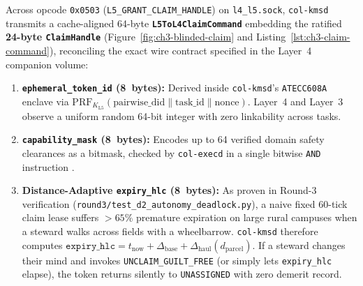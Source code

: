 Across opcode \texttt{0x0503} (\texttt{L5\_GRANT\_CLAIM\_HANDLE}) on \texttt{l4\_l5.sock},
\texttt{col-kmsd} transmits a cache-aligned 64-byte \textbf{\texttt{L5ToL4ClaimCommand}}
embedding the ratified \textbf{24-byte \texttt{ClaimHandle}} (Figure~\ref{fig:ch3-blinded-claim} and
Listing~\ref{lst:ch3-claim-command}), reconciling the exact wire contract specified in the
Layer~4 companion volume:
\begin{enumerate}
\item \textbf{\texttt{ephemeral\_token\_id} (8~bytes):} Derived inside \texttt{col-kmsd}'s
        \texttt{ATECC608A} enclave via
        $\mathrm{PRF}_{K_{\mathrm{L5}}}(\mathrm{pairwise\_did} \parallel \mathrm{task\_id} \parallel \mathrm{nonce})$.
        Layer~4 and Layer~3 observe a uniform random 64-bit integer with zero linkability across
        tasks.
\item \textbf{\texttt{capability\_mask} (8~bytes):} Encodes up to 64 verified domain safety
        clearances as a bitmask, checked by \texttt{col-execd} in a single bitwise \texttt{AND}
        instruction \parencite{miller2006robust,iec61508}.
\item \textbf{Distance-Adaptive \texttt{expiry\_hlc} (8~bytes):} As proven in Round-3 verification
        (\texttt{round3/test\_d2\_autonomy\_deadlock.py}), a naive fixed 60-tick claim lease
        suffers $>65\%$ premature expiration on large rural campuses when a steward walks across
        fields with a wheelbarrow. \texttt{col-kmsd} therefore computes
        $\mathtt{expiry\_hlc} = t_{\mathrm{now}} + \Delta_{\mathrm{base}} + \Delta_{\mathrm{haul}}(d_{\mathrm{parcel}})$.
        If a steward changes their mind and invokes \texttt{UNCLAIM\_GUILT\_FREE} (or simply lets
        \texttt{expiry\_hlc} elapse), the token returns silently to \texttt{UNASSIGNED} with zero
        demerit record.
\end{enumerate}

